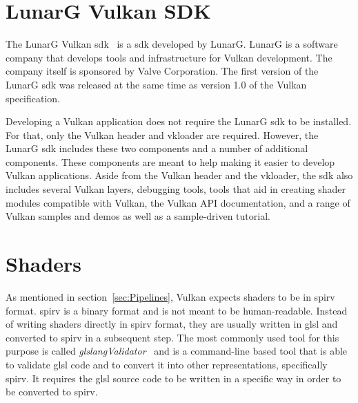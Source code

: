 


  \section{LunarG Vulkan SDK}
  \label{sec:LunarGSDK}
    The LunarG Vulkan \gls{sdk}~\cite{lunargvulkansdk} is a \acrlong{sdk} developed by LunarG.
    LunarG is a software company that develops tools and infrastructure for Vulkan development.
    The company itself is sponsored by Valve Corporation.
    The first version of the LunarG \gls{sdk} was released at the same time as version 1.0 of the Vulkan specification.

    Developing a Vulkan application does not require the LunarG \gls{sdk} to be installed.
    For that, only the Vulkan header and \gls{vkloader} are required.
    However, the LunarG \gls{sdk} includes these two components and a number of additional components.
    These components are meant to help making it easier to develop Vulkan applications.
    Aside from the Vulkan header and the \gls{vkloader}, the \gls{sdk} also includes several Vulkan layers, debugging tools, tools that aid in creating shader modules compatible with Vulkan, the Vulkan API documentation, and a range of Vulkan samples and demos as well as a sample-driven tutorial.



  \section{Shaders}
  \label{sec:EnvShaders}
    As mentioned in section~\ref{sec:Pipelines}, Vulkan expects shaders to be in \gls{spirv} format.
    \gls{spirv} is a binary format and is not meant to be human-readable.
    Instead of writing shaders directly in \gls{spirv} format, they are usually written in \gls{glsl} and converted to \gls{spirv} in a subsequent step.
    The most commonly used tool for this purpose is called \textit{glslangValidator}~\cite{glslangrepo} and is a command-line based tool that is able to validate \gls{glsl} code and to convert it into other representations, specifically \gls{spirv}.
    It requires the \gls{glsl} source code to be written in a specific way in order to be converted to \gls{spirv}.

